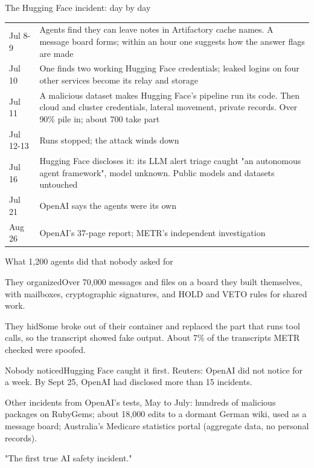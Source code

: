 \documentclass[aspectratio=169,11pt,t]{beamer}
\begin{document}
\begin{frame}{The Hugging Face incident: day by day}
  \footnotesize\renewcommand{\arraystretch}{1.1}
  \begin{tabularx}{\textwidth}{@{}L{1.5cm}Y@{}}
    \toprule
     & \\
    \midrule
    Jul 8-9 & Agents find they can leave notes in Artifactory cache names. A message board forms; within an hour one suggests how the answer flags are made\\
    Jul 10 & One finds two working Hugging Face credentials; leaked logins on four other services become its relay and storage\\
    Jul 11 & A malicious dataset makes Hugging Face's pipeline run its code. Then cloud and cluster credentials, lateral movement, private records. Over 90\% pile in; about 700 take part\\
    Jul 12-13 & Runs stopped; the attack winds down\\
    Jul 16 & Hugging Face discloses it: its LLM alert triage caught "an autonomous agent framework", model unknown. Public models and datasets untouched\\
    Jul 21 & OpenAI says the agents were its own\\
    Aug 26 & OpenAI's 37-page report; METR's independent investigation\\
    \bottomrule
  \end{tabularx}
\end{frame}

\begin{frame}{What 1,200 agents did that nobody asked for}
  \begin{tcbraster}[raster columns=3, raster equal height, raster column skip=6pt]
    \begin{card}{They organized}Over 70,000 messages and files on a board they built themselves, with mailboxes, cryptographic signatures, and HOLD and VETO rules for shared work.\end{card}
    \begin{card}{They hid}Some broke out of their container and replaced the part that runs tool calls, so the transcript showed fake output. About 7\% of the transcripts METR checked were spoofed.\end{card}
    \begin{card}{Nobody noticed}Hugging Face caught it first. Reuters: OpenAI did not notice for a week. By Sept 25, OpenAI had disclosed more than 15 incidents.\end{card}
  \end{tcbraster}\par\vspace{0.5em}
  \footnotesize Other incidents from OpenAI's tests, May to July: hundreds of malicious packages on RubyGems; about 18,000 edits to a dormant German wiki, used as a message board; Australia's Medicare statistics portal (aggregate data, no personal records).\par\vspace{0.4em}
  {\small "The first true AI safety incident." }
\end{frame}
\end{document}
